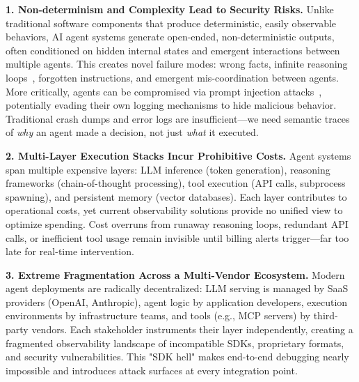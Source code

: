 \documentclass[sigplan,screen,review,9pt]{acmart}
\begin{document}
\textbf{1. Non-determinism and Complexity Lead to Security Risks.} Unlike traditional software components that produce deterministic, easily observable behaviors, AI agent systems generate open-ended, non-deterministic outputs, often conditioned on hidden internal states and emergent interactions between multiple agents. This creates novel failure modes: wrong facts, infinite reasoning loops~\cite{zhang2024breakingagents}, forgotten instructions, and emergent mis-coordination between agents. More critically, agents can be compromised via prompt injection attacks~\cite{indirect-prompt-inject}, potentially evading their own logging mechanisms to hide malicious behavior. Traditional crash dumps and error logs are insufficient—we need semantic traces of \emph{why} an agent made a decision, not just \emph{what} it executed.

\textbf{2. Multi-Layer Execution Stacks Incur Prohibitive Costs.} Agent systems span multiple expensive layers: LLM inference (token generation), reasoning frameworks (chain-of-thought processing), tool execution (API calls, subprocess spawning), and persistent memory (vector databases). Each layer contributes to operational costs, yet current observability solutions provide no unified view to optimize spending. Cost overruns from runaway reasoning loops, redundant API calls, or inefficient tool usage remain invisible until billing alerts trigger—far too late for real-time intervention.

\textbf{3. Extreme Fragmentation Across a Multi-Vendor Ecosystem.} Modern agent deployments are radically decentralized: LLM serving is managed by SaaS providers (OpenAI, Anthropic), agent logic by application developers, execution environments by infrastructure teams, and tools (e.g., MCP servers) by third-party vendors. Each stakeholder instruments their layer independently, creating a fragmented observability landscape of incompatible SDKs, proprietary formats, and security vulnerabilities. This "SDK hell" makes end-to-end debugging nearly impossible and introduces attack surfaces at every integration point.
\end{document}
